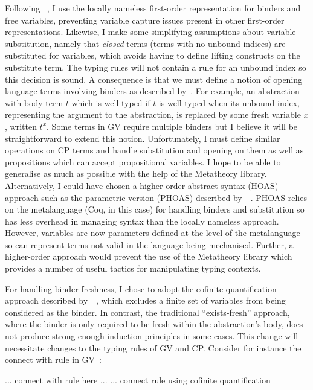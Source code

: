 \documentclass{mprop}
\newcommand{\1}{\textbf{1}\xspace}
\begin{document}
Following \citeauthor{Aydemir:2008:EFM}~\cite{Aydemir:2008:EFM}, I use the locally nameless first-order representation for binders and free variables, preventing variable capture issues present in other first-order representations. Likewise, I make some simplifying assumptions about variable substitution, namely that \textit{closed} terms (terms with no unbound indices) are substituted for variables, which avoids having to define lifting constructs on the substitute term. The typing rules will not contain a rule for an unbound index so this decision is sound. A consequence is that we must define a notion of opening language terms involving binders as described by~\citeauthor{Aydemir:2008:EFM}. For example, an abstraction with body term $t$ which is well-typed if $t$ is well-typed when its unbound index, representing the argument to the abstraction, is replaced by some fresh variable $x$, written $t^x$. Some terms in GV require multiple binders but I believe it will be straightforward to extend this notion. Unfortunately, I must define similar operations on CP terms and handle substitution and opening on them as well as propositions which can accept propositional variables. I hope to be able to generalise as much as possible with the help of the Metatheory library. Alternatively, I could have chosen a higher-order abstract syntax (HOAS) approach such as the parametric version (PHOAS) described by~\citeauthor{Chlipala:2008:PHOAS}~\cite{Chlipala:2008:PHOAS}. PHOAS relies on the metalanguage (Coq, in this case) for handling binders and substitution so has less overhead in managing syntax than the locally nameless approach. However, variables are now parameters defined at the level of the metalanguage so can represent terms not valid in the language being mechanised. Further, a higher-order approach would prevent the use of the Metatheory library which provides a number of useful tactics for manipulating typing contexts.

For handling binder freshness, I chose to adopt the cofinite quantification approach described by~\cite{Aydemir:2008:EFM}~\cite{Aydemir:2008:EFM}, which excludes a finite set of variables from being considered as the binder. In contrast, the traditional ``exists-fresh'' approach, where the binder is only required to be fresh within the abstraction's body, does not produce strong enough induction principles in some cases. This change will necessitate changes to the typing rules of GV and CP. Consider for instance the connect with rule in GV~\cite{Wadler:2012}:

... connect with rule here ... ... connect rule using cofinite quantification
\end{document}
